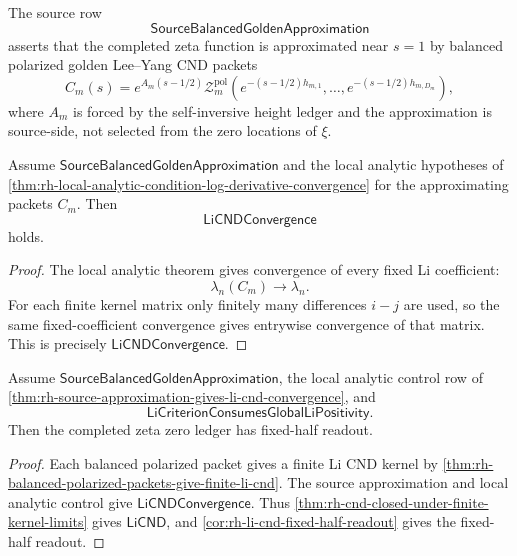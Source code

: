 \begin{definition}
\label{def:rh-source-balanced-golden-approximation}
The source row
$$
\mathsf{SourceBalancedGoldenApproximation}
$$
asserts that the completed zeta function is approximated near $s=1$ by
balanced polarized golden Lee--Yang CND packets
$$
C_m(s)
=
e^{A_m(s-1/2)}
\mathcal Z_m^{\mathrm{pol}}
\left(
e^{-(s-1/2)h_{m,1}},
\ldots,
e^{-(s-1/2)h_{m,D_m}}
\right),
$$
where $A_m$ is forced by the self-inversive height ledger and the
approximation is source-side, not selected from the zero locations of
$\xi$.
\end{definition}

\begin{theorem}
\label{thm:rh-source-approximation-gives-li-cnd-convergence}
Assume $\mathsf{SourceBalancedGoldenApproximation}$ and the local
analytic hypotheses of
\autoref{thm:rh-local-analytic-condition-log-derivative-convergence}
for the approximating packets $C_m$.  Then
$$
\mathsf{LiCNDConvergence}
$$
holds.
\end{theorem}

\begin{proof}
The local analytic theorem gives convergence of every fixed Li
coefficient:
$$
\lambda_n(C_m)\to\lambda_n.
$$
For each finite kernel matrix only finitely many differences $i-j$ are
used, so the same fixed-coefficient convergence gives entrywise
convergence of that matrix.  This is precisely
$\mathsf{LiCNDConvergence}$.
\end{proof}

\begin{corollary}
\label{cor:rh-balanced-polarized-source-approximation-fixed-half-readout}
Assume $\mathsf{SourceBalancedGoldenApproximation}$, the local analytic
control row of
\autoref{thm:rh-source-approximation-gives-li-cnd-convergence}, and
$$
\mathsf{LiCriterionConsumesGlobalLiPositivity}.
$$
Then the completed zeta zero ledger has fixed-half readout.
\end{corollary}

\begin{proof}
Each balanced polarized packet gives a finite Li CND kernel by
\autoref{thm:rh-balanced-polarized-packets-give-finite-li-cnd}.  The
source approximation and local analytic control give
$\mathsf{LiCNDConvergence}$.  Thus
\autoref{thm:rh-cnd-closed-under-finite-kernel-limits} gives
$\mathsf{LiCND}$, and
\autoref{cor:rh-li-cnd-fixed-half-readout} gives the fixed-half readout.
\end{proof}

